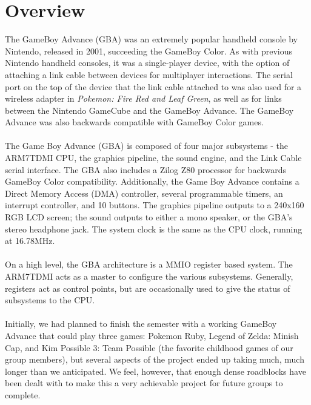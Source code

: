 \documentclass[11pt,a4paper]{article}
\begin{document}
	\section{Overview}
	The GameBoy Advance (GBA) was an extremely popular handheld console by Nintendo, released in 2001, succeeding the GameBoy Color. As with previous Nintendo handheld consoles, it was a single-player device, with the option of attaching a link cable between devices for multiplayer interactions. The serial port on the top of the device that the link cable attached to was also used for a wireless adapter in \textit{Pokemon: Fire Red and Leaf Green}, as well as for links between the Nintendo GameCube and the GameBoy Advance. The GameBoy Advance was also backwards compatible with GameBoy Color games.\\\\
	The Game Boy Advance (GBA) is composed of four major subsystems - the ARM7TDMI CPU, the graphics pipeline, the sound engine, and the Link Cable serial interface. The GBA also includes a Zilog Z80 processor for backwards GameBoy Color compatibility. Additionally, the Game Boy Advance contains a Direct Memory Access (DMA) controller, several programmable timers, an interrupt controller, and 10 buttons. The graphics pipeline outputs to a 240x160 RGB LCD screen; the sound outputs to either a mono speaker, or the GBA's stereo headphone jack. The system clock is the same as the CPU clock, running at 16.78MHz.\cite{GBAManual} \\\\	
	On a high level, the GBA architecture is a MMIO register based system. The ARM7TDMI acts as a master to configure the various subsystems. Generally, registers act as control points, but are occasionally used to give the status of subsystems to the CPU.\\\\
	Initially, we had planned to finish the semester with a working GameBoy Advance that could play three games: Pokemon Ruby, Legend of Zelda: Minish Cap, and Kim Possible 3: Team Possible (the favorite childhood games of our group members), but several aspects of the project ended up taking much, much longer than we anticipated. We feel, however, that enough dense roadblocks have been dealt with to make this a very achievable project for future groups to complete.
	
\end{document}
